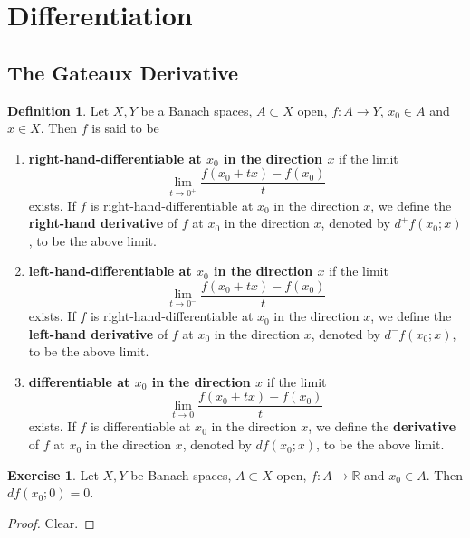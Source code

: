 \documentclass[12pt]{amsart}
\theoremstyle{definition}
\newtheorem{defn}[definition]{Definition}
\newtheorem{ex}[definition]{Exercise}
\newcommand{\R}{\mathbb{R}}
\newcommand{\tbf}[1]{\textbf{#1}}
\DeclareMathOperator*{\0}{\mbf{0}}
\DeclareMathOperator*{\1}{\mbf{1}}
\newcommand{\lex}[1]{\label{ex:#1}}
\newcommand{\ld}[1]{\label{defn:#1}}
\begin{document}
	
	\newpage
	\section{Differentiation}
	
	\subsection{The Gateaux Derivative}
	
	\begin{defn} \ld{61001}
	Let $X,Y$ be a Banach spaces, $A \subset X$ open, $f:A \rightarrow Y$, $x_0 \in A$ and $x \in X$. Then $f$ is said to be 
	\begin{enumerate}
	\item \tbf{right-hand-differentiable at $x_0$ in the direction $x$} if the limit
	$$  \lim_{t \rightarrow 0^+} \frac{f(x_0 +tx) - f(x_0)}{t}$$
	exists. If $f$ is right-hand-differentiable at $x_0$ in the direction $x$, we define the \tbf{right-hand derivative} of $f$ at $x_0$ in the direction $x$, denoted by  $d^+ f(x_0; x)$, to be the above limit. 
	
	\item \tbf{left-hand-differentiable at $x_0$ in the direction $x$} if the limit
	$$  \lim_{t \rightarrow 0^-} \frac{f(x_0 +tx) - f(x_0)}{t}$$
	exists. If $f$ is right-hand-differentiable at $x_0$ in the direction $x$, we define the \tbf{left-hand derivative} of $f$ at $x_0$ in the direction $x$, denoted by  $d^- f(x_0; x)$, to be the above limit. 
	
	\item \tbf{differentiable at $x_0$ in the direction $x$} if the limit
	$$  \lim_{t \rightarrow 0} \frac{f(x_0 +tx) - f(x_0)}{t}$$
	exists. If $f$ is differentiable at $x_0$ in the direction $x$, we define the \tbf{derivative} of $f$ at $x_0$ in the direction $x$, denoted by $d f(x_0; x)$, to be the above limit. 
	\end{enumerate}
	\end{defn}	
	
	\begin{ex} \lex{61002}
	Let $X, Y$ be Banach spaces, $A \subset X$ open, $f:A \rightarrow \R$ and $x_0 \in A$. Then $df(x_0; 0) = 0$.
	\end{ex}
	
	\begin{proof}
	Clear.
	\end{proof}
	
\end{document}
